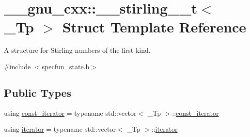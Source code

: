 \hypertarget{struct____gnu__cxx_1_1____stirling__1__t}{}\section{\+\_\+\+\_\+gnu\+\_\+cxx\+:\+:\+\_\+\+\_\+stirling\+\_\+\_\+t$<$ \+\_\+\+Tp $>$ Struct Template Reference}
\label{struct____gnu__cxx_1_1____stirling__1__t}


A structure for Stirling numbers of the first kind.  




{\ttfamily \#include $<$specfun\+\_\+state.\+h$>$}

\subsection*{Public Types}
\begin{DoxyCompactItemize}
\item 
using \hyperlink{struct____gnu__cxx_1_1____stirling__1__t_a2b4e459dac02038428602f6315b97941}{const\+\_\+iterator} = typename std\+::vector$<$ \+\_\+\+Tp $>$\+::\hyperlink{struct____gnu__cxx_1_1____stirling__1__t_a2b4e459dac02038428602f6315b97941}{const\+\_\+iterator}
\item 
using \hyperlink{struct____gnu__cxx_1_1____stirling__1__t_a4dad153706e77f66c38d2a620230ac35}{iterator} = typename std\+::vector$<$ \+\_\+\+Tp $>$\+::\hyperlink{struct____gnu__cxx_1_1____stirling__1__t_a4dad153706e77f66c38d2a620230ac35}{iterator}
\end{DoxyCompactItemize}
